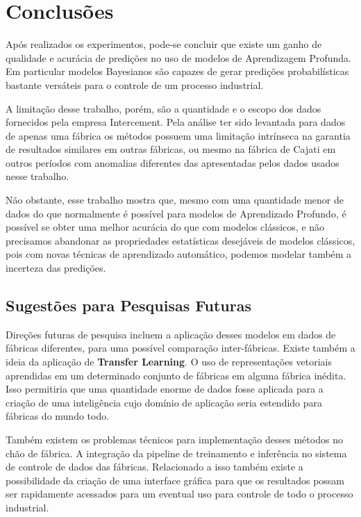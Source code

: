 \chapter{Conclusões}
\label{cap:conclusoes}


Após realizados os experimentos, pode-se concluir que existe um ganho de
qualidade e acurácia de predições no uso de modelos de Aprendizagem
Profunda. Em particular modelos Bayesianos são capazes de gerar predições
probabilísticas bastante versáteis para o controle de um processo industrial.

A limitação desse trabalho, porém, são a quantidade e o escopo dos dados
fornecidos pela empresa Intercement. Pela análise ter sido levantada para dados
de apenas uma fábrica os métodos possuem uma limitação intrínseca na garantia de
resultados similares em outras fábricas, ou mesmo na fábrica de Cajati em
outros períodos com anomalias diferentes das apresentadas pelos dados usados
nesse trabalho.

Não obstante, esse trabalho mostra que, mesmo com uma quantidade menor de dados
do que normalmente é possível para modelos de Aprendizado Profundo, é possível
se obter uma melhor acurácia do que com modelos clássicos, e não precisamos
abandonar as propriedades estatísticas desejáveis de modelos clássicos, pois com
novas técnicas de aprendizado automático, podemos modelar também a incerteza das predições.


\section{Sugestões para Pesquisas Futuras} 

Direções futuras de pesquisa incluem a aplicação desses modelos em dados
de fábricas diferentes, para uma possível comparação inter-fábricas. Existe
também a ideia da aplicação de \textbf{Transfer Learning}. O uso de
representações vetoriais aprendidas em um determinado conjunto de fábricas em
alguma fábrica inédita. Isso permitiria que uma quantidade enorme de dados fosse
aplicada para a criação de uma inteligência cujo domínio de aplicação seria
estendido para fábricas do mundo todo.

Também existem os problemas técnicos para implementação desses métodos no chão
de fábrica. A integração da pipeline de treinamento e inferência no sistema de
controle de dados das fábricas. Relacionado a isso também existe a possibilidade
da criação de uma interface gráfica para que os resultados possam ser rapidamente acessados
para um eventual uso para controle de todo o processo industrial. 



